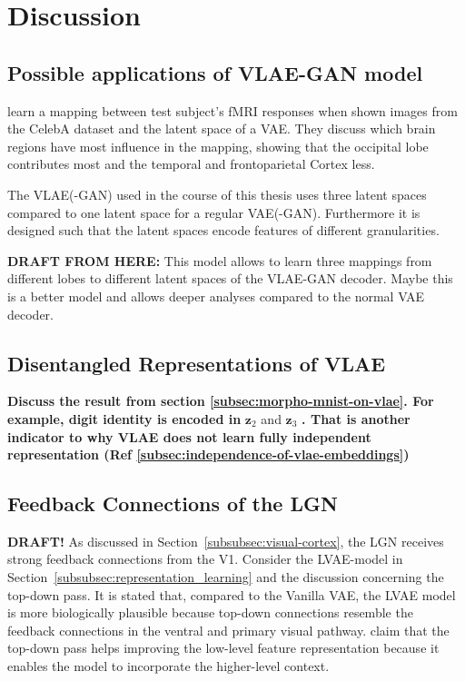 \documentclass[11pt]{article}
\begin{document}
\section{Discussion}\label{sec:discussion}

\subsection{Possible applications of VLAE-GAN model}
\citet{vanrullen2019reconstructing} learn a mapping between test subject's fMRI responses when shown images from the CelebA dataset and the latent space of a \ac{VAE}.
They discuss which brain regions have most influence in the mapping, showing that the occipital lobe contributes most and the temporal and frontoparietal Cortex less.

The \ac{VLAE}(-\ac{GAN}) used in the course of this thesis uses three latent spaces compared to one latent space for a regular \ac{VAE}(-\ac{GAN}).
Furthermore it is designed such that the latent spaces encode features of different granularities.

\textbf{DRAFT FROM HERE:}
This model allows to learn three mappings from different lobes to different latent spaces of the VLAE-GAN decoder.
Maybe this is a better model and allows deeper analyses compared to the normal VAE decoder.


\subsection{Disentangled Representations of VLAE}
\textbf{Discuss the result from section \ref{subsec:morpho-mnist-on-vlae}. For example, digit identity is encoded in} $\bm{z}_2$ and $\bm{z}_3$ \textbf{. That is another indicator to why VLAE does not learn fully independent representation (Ref \ref{subsec:independence-of-vlae-embeddings})}

\subsection{Feedback Connections of the \acl{LGN}}\label{subsec:feedback-connections-of-the-lateral-geniculate-nucleus}
\textbf{DRAFT!}
As discussed in Section~\ref{subsubsec:visual-cortex}, the \ac{LGN} receives strong feedback connections from the \ac{V1}.
Consider the \ac{LVAE}-model in Section~\ref{subsubsec:representation_learning} and the discussion concerning the top-down pass.
It is stated that, compared to the Vanilla VAE, the \ac{LVAE} model is more biologically plausible because top-down connections resemble the feedback connections in the ventral and primary visual pathway.
\citet{sonderby2016ladder} claim that the top-down pass helps improving the low-level feature representation because it enables the model to incorporate the higher-level context.
\end{document}
